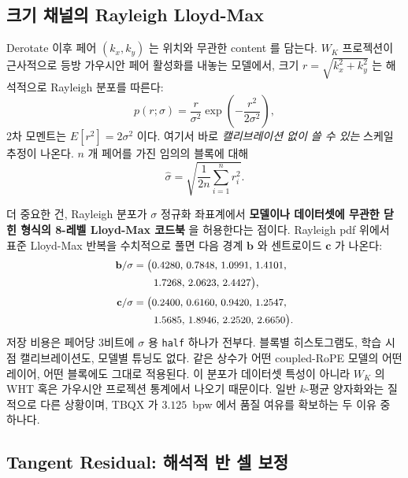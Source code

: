 \documentclass[10pt,twocolumn]{article}
\begin{document}
\subsection{크기 채널의 Rayleigh Lloyd-Max}
\label{sec:rayleigh}

Derotate 이후 페어 $(k_x, k_y)$ 는 위치와 무관한 content 를 담는다. $W_K$ 프로젝션이 근사적으로 등방 가우시안 페어 활성화를 내놓는 모델에서, 크기 $r = \sqrt{k_x^2 + k_y^2}$ 는 해석적으로 Rayleigh 분포를 따른다:
\begin{equation}
p(r;\sigma) = \frac{r}{\sigma^2}\exp\!\left(-\frac{r^2}{2\sigma^2}\right),
\end{equation}
2차 모멘트는 $E[r^2] = 2\sigma^2$ 이다. 여기서 바로 \emph{캘리브레이션 없이 쓸 수 있는} 스케일 추정이 나온다. $n$ 개 페어를 가진 임의의 블록에 대해
\begin{equation}
\hat\sigma = \sqrt{\frac{1}{2n}\sum_{i=1}^{n} r_i^2}.
\end{equation}

더 중요한 건, Rayleigh 분포가 $\sigma$ 정규화 좌표계에서 \textbf{모델이나 데이터셋에 무관한 닫힌 형식의 8-레벨 Lloyd-Max 코드북} 을 허용한다는 점이다. Rayleigh pdf 위에서 표준 Lloyd-Max 반복을 수치적으로 풀면 다음 경계 $\mathbf{b}$ 와 센트로이드 $\mathbf{c}$ 가 나온다:
\begin{equation}
\small
\begin{aligned}
\mathbf{b}/\sigma &= \bigl(0.4280,\,0.7848,\,1.0991,\,1.4101,\\
                  &\qquad 1.7268,\,2.0623,\,2.4427\bigr),\\[2pt]
\mathbf{c}/\sigma &= \bigl(0.2400,\,0.6160,\,0.9420,\,1.2547,\\
                  &\qquad 1.5685,\,1.8946,\,2.2520,\,2.6650\bigr).
\end{aligned}
\end{equation}
저장 비용은 페어당 3비트에 $\sigma$ 용 \texttt{half} 하나가 전부다. 블록별 히스토그램도, 학습 시점 캘리브레이션도, 모델별 튜닝도 없다. 같은 상수가 어떤 coupled-RoPE 모델의 어떤 레이어, 어떤 블록에도 그대로 적용된다. 이 분포가 데이터셋 특성이 아니라 $W_K$ 의 WHT 혹은 가우시안 프로젝션 통계에서 나오기 때문이다. 일반 $k$-평균 양자화와는 질적으로 다른 상황이며, TBQX 가 $3.125$~bpw 에서 품질 여유를 확보하는 두 이유 중 하나다.

\subsection{Tangent Residual: 해석적 반 셀 보정}
\label{sec:tangent}
\end{document}
